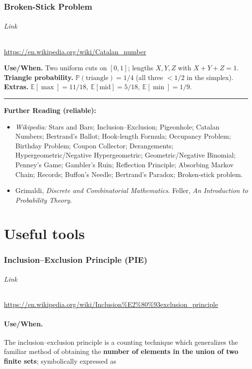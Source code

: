 \documentclass[11pt,A4,twoside]{article}
\let\oldsection\section
\renewcommand{\section}{\FloatBarrier\oldsection}
\let\oldsubsection\subsection
\renewcommand{\subsection}{\FloatBarrier\oldsubsection}
\numberwithin{equation}{section}
\newcommand{\E}{\mathbb{E}}
\theoremstyle{definition}
\theoremstyle{remark}
\newcommand{\Prob}{\mathbb{P}}
\begin{document}
\section{Broken-Stick Problem}
\paragraph{Link} \url{https://en.wikipedia.org/wiki/Catalan_number}

\textbf{Use/When.} Two uniform cuts on \([0,1]\); lengths \(X,Y,Z\) with \(X+Y+Z=1\).\\
\textbf{Triangle probability.} \( \Prob(\text{triangle})=1/4\) (all three \(<1/2\) in the simplex).\\
\textbf{Extras.} \(\E[\max]=11/18,\ \E[\text{mid}]=5/18,\ \E[\min]=1/9\).

\vspace{6pt}
\hrule
\vspace{4pt}
\noindent\textbf{Further Reading (reliable):}
\begin{itemize}
  \item \textit{Wikipedia:} Stars and Bars; Inclusion–Exclusion; Pigeonhole; Catalan Numbers; Bertrand’s Ballot; Hook-length Formula; Occupancy Problem; Birthday Problem; Coupon Collector; Derangements; Hypergeometric/Negative Hypergeometric; Geometric/Negative Binomial; Penney’s Game; Gambler’s Ruin; Reflection Principle; Absorbing Markov Chain; Records; Buffon’s Needle; Bertrand’s Paradox; Broken-stick problem.
  \item Grimaldi, \emph{Discrete and Combinatorial Mathematics}. Feller, \emph{An Introduction to Probability Theory}.
\end{itemize}

\part{Useful tools}
\section{Inclusion–Exclusion Principle (PIE)}
\paragraph{Link} \url{https://en.wikipedia.org/wiki/Inclusion%E2%80%93exclusion_principle}
\subsection{Use/When.} The inclusion–exclusion principle is a counting technique which generalizes the familiar method of obtaining the \textbf{number of elements in the union of two finite sets}; symbolically expressed as
\end{document}
